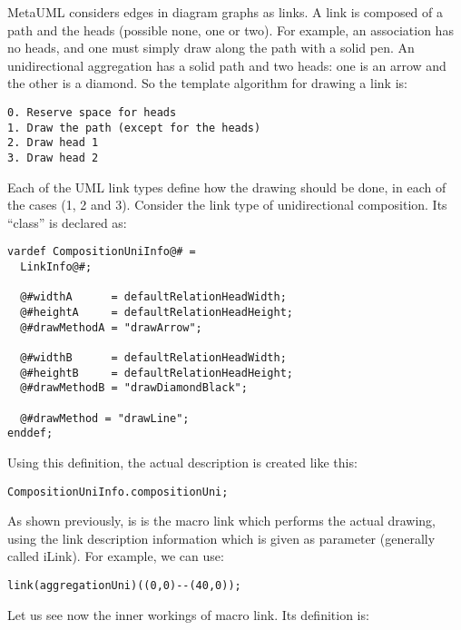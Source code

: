 \documentclass{article}
\newcommand{\code}{\ttfamily}
\begin{document}
MetaUML considers edges in diagram graphs as links. A link is composed of a path and the
heads (possible none, one or two). For example, an association has no heads, and one must simply
draw along the path with a solid pen. An unidirectional aggregation has a solid path and two
heads: one is an arrow and the other is a diamond. So the template algorithm for drawing a link
is:

\begin{verbatim}
0. Reserve space for heads
1. Draw the path (except for the heads)
2. Draw head 1
3. Draw head 2
\end{verbatim}

Each of the UML link types define how the drawing should be done, in each of the
cases (1, 2 and 3). Consider the link type of unidirectional composition.
Its ``class'' is declared as:

\begin{verbatim}
vardef CompositionUniInfo@# =
  LinkInfo@#;

  @#widthA      = defaultRelationHeadWidth;
  @#heightA     = defaultRelationHeadHeight;
  @#drawMethodA = "drawArrow";

  @#widthB      = defaultRelationHeadWidth;
  @#heightB     = defaultRelationHeadHeight;
  @#drawMethodB = "drawDiamondBlack";

  @#drawMethod = "drawLine";
enddef;
\end{verbatim}

Using this definition, the actual description is created like this:

\begin{verbatim}
CompositionUniInfo.compositionUni;
\end{verbatim}

As shown previously, is is the macro {\code link} which
performs the actual drawing, using the link description information
which is given as parameter (generally called {\code iLink}).
For example, we can use:

\begin{verbatim}
link(aggregationUni)((0,0)--(40,0));
\end{verbatim}


Let us see now the inner workings of macro {\code link}. Its definition is:
\end{document}
